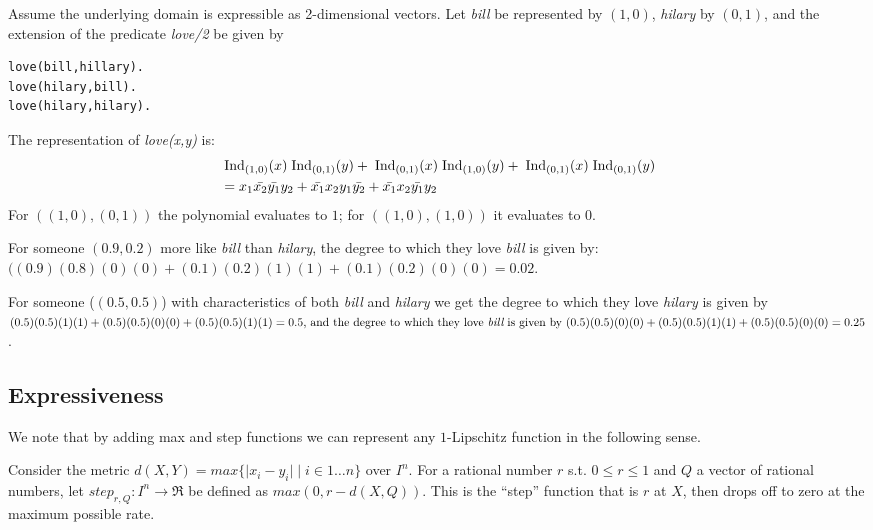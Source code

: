 \documentclass{article} %
\begin{document}
\begin{example}
Assume the underlying domain is expressible as 2-dimensional vectors. Let {\em bill} be represented by \((1, 0)\), {\em hilary} by \((0,1)\), and the extension of the predicate {\em love/2} be given by
\begin{lstlisting}
love(bill,hillary).
love(hilary,bill).
love(hilary,hilary).
\end{lstlisting}
The representation of {\em love(x,y)} is:
\begin{align*}
&\;\mbox{Ind}_{(1,0)}(x)\;\mbox{Ind}_{(0,1)}(y) + \;\mbox{Ind}_{(0,1)}(x)\;\mbox{Ind}_{(1,0)}(y) + \;\mbox{Ind}_{(0,1)}(x)\;\mbox{Ind}_{(0,1)}(y)  \\
&= x_1\bar{x_2}\bar{y_1}y_2 + \bar{x_1}x_2y_1\bar{y_2} + \bar{x_1}x_2\bar{y_1}y_2
\end{align*}
For \(((1,0),(0,1))\) the polynomial evaluates to \(1\); for \(((1,0),(1,0))\) it evaluates to \(0\). 

For someone \((0.9,0.2)\) more like {\em bill} than {\em hilary}, the degree to which they love
{\em bill} is given by: 
\(((0.9)(0.8)(0)(0) + (0.1)(0.2)(1)(1) + (0.1)(0.2)(0)(0)=0.02\).

For someone (\((0.5,0.5)\)) with characteristics of both {\em bill} and {\em hilary} we get the degree to which they love {\em hilary}  is given by
\((0.5)(0.5)(1)(1)+(0.5)(0.5)(0)(0)+(0.5)(0.5)(1)(1)=0.5$, and the degree to which they love {\em bill} is given by $(0.5)(0.5)(0)(0) + (0.5)(0.5)(1)(1) + (0.5)(0.5)(0)(0)=0.25\).

\end{example}

\subsection{Expressiveness}
We note that by adding max and step functions we can represent any $1$-Lipschitz function in the following sense.

Consider the metric \(d(X,Y) = max \{\lvert x_i - y_i \rvert \mid i\in 1\ldots n \}\) over \(I^n\). For a 
rational number \(r\) s.t. \(0 \leq r \leq 1\) and \(Q\) a vector of rational numbers, let \(step_{r,Q}:I^n \rightarrow \Re\) be defined as \(max(0, r-d(X,Q))\). This is the ``step'' function that is \(r\) at \(X\), then drops off to zero at the maximum possible rate. 
\end{document}
